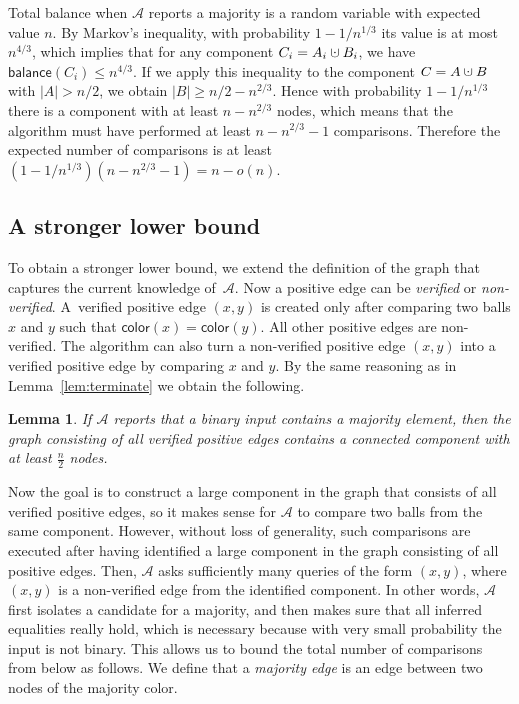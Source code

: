 \documentclass{article}[11pt,a4paper]
\newtheorem{lemma}[definition]{Lemma}
\newcommand{\ballcolor}{\mathsf{color}}
\newcommand{\balance}{\mathsf{balance}}
\newcommand{\cupdot}{\mathbin{\mathaccent\cdot\cup}}
\begin{document}
Total balance when $\mathcal{A}$ reports a majority is a random variable with expected value $n$.
By Markov's inequality, with probability $1-1/n^{1/3}$ its value is at most $n^{4/3}$, which
implies that for any component $C_i = A_i \cupdot B_i$, we have $\balance(C_i) \leq n^{4/3}$. If we apply this inequality to the component $C = A \cupdot B$ with $|A| > n/2$, we obtain $|B| \geq n/2 - n^{2/3}$.
Hence with probability $1-1/n^{1/3}$ there is a component with at least $n-n^{2/3}$
nodes,
which means that the algorithm must have performed at least $n-n^{2/3} - 1$ comparisons.
Therefore the expected number of comparisons is at least $(1-1/n^{1/3})(n-n^{2/3}-1) = n - o(n)$.

\subsection{A stronger lower bound}
\label{section:stronger_lowerbound}

To obtain a stronger lower bound, we extend the definition of the graph that captures the current knowledge
of~$\mathcal{A}$. Now a positive edge can be \emph{verified} or \emph{non-verified}. A~verified
positive edge $(x,y)$ is created only after comparing two balls $x$ and $y$ such that $\ballcolor(x)=\ballcolor(y)$.
All other positive edges are non-verified. The algorithm can also turn a non-verified positive edge
$(x,y)$ into a verified positive edge by comparing $x$ and $y$. By the same reasoning as in
Lemma~\ref{lem:terminate} we obtain the following.

\begin{lemma}
\label{lem:terminate2}
If $\mathcal{A}$ reports that a binary input contains a majority element, then the graph consisting
of all verified positive edges contains a connected component with at least $\frac{n}{2}$ nodes.
\end{lemma}

Now the goal is to construct a large component in the graph that consists of all verified positive
edges, so it makes sense for $\mathcal{A}$ to compare two balls from the same component.
However, without loss of generality, such comparisons are executed after having identified a
large component in the graph consisting of all positive edges. Then, $\mathcal{A}$ asks sufficiently many
queries of the form $(x,y)$, where $(x,y)$ is a non-verified edge from the identified component.
In other words, $\mathcal{A}$ first isolates a candidate for a majority, and then makes sure that
all inferred equalities really hold, which is necessary because with very small probability the input
is not binary. This allows us to bound the total number of comparisons from below as follows. We define that a \emph{majority edge} is an edge between two nodes of the majority color.
\end{document}

